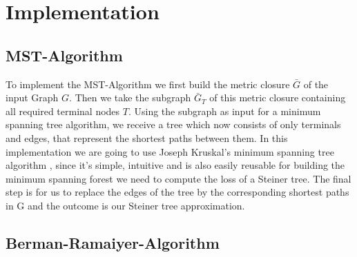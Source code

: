 
\chapter{Implementation}\label{chapter:implementation}

\section{MST-Algorithm}

To implement the MST-Algorithm we first build the metric closure $\bar{G}$ of the input Graph $G$. Then we take the subgraph $\bar{G}_T$ of this metric closure containing all required terminal nodes $T$. Using the subgraph as input for a minimum spanning tree algorithm, we receive a tree which now consists of only terminals and edges, that represent the shortest paths between them. In this implementation we are going to use Joseph Kruskal's minimum spanning tree algorithm \cite{kruskal1956shortest}, since it's simple, intuitive and is also easily reusable for building the minimum spanning forest we need to compute the loss of a Steiner tree. The final step is for us to replace the edges of the tree by the corresponding shortest paths in G and the outcome is our Steiner tree approximation.

\section{Berman-Ramaiyer-Algorithm}

